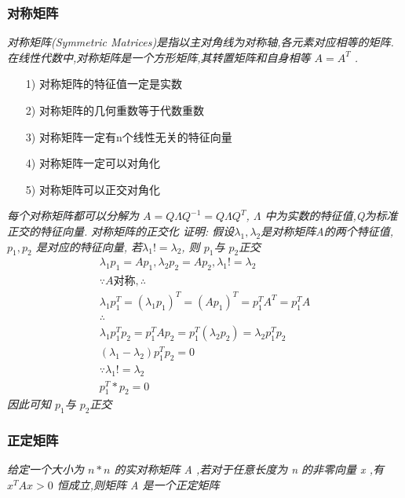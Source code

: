 \documentclass{scrartcl}
\numberwithin{equation}{section}   %
\begin{document}
\subsubsection{对称矩阵}
\textsl{
    对称矩阵(Symmetric Matrices)是指以主对角线为对称轴,各元素对应相等的矩阵. 在线性代数中,对称矩阵是一个方形矩阵,其转置矩阵和自身相等 $ A = A^T $ .
}
\begin{itemize}\item [1)] 对称矩阵的特征值一定是实数 \item [2)] 对称矩阵的几何重数等于代数重数\item [3)] 对称矩阵一定有n个线性无关的特征向量\item [4)] 对称矩阵一定可以对角化\item [5)] 对称矩阵可以正交对角化\end{itemize}
\textsl{ 每个对称矩阵都可以分解为 $ A = Q \Lambda Q^{-1} = Q \Lambda Q^{T} $, $ \Lambda $ 中为实数的特征值,Q为标准正交的特征向量. }
\textsl{对称矩阵的正交化
    证明: 假设$ \lambda_1, \lambda_2 $是对称矩阵A的两个特征值,$ p_1, p_2 $ 是对应的特征向量, 若$ \lambda_1 != \lambda_2 $, 则 $ p_1 $与 $ p_2 $正交}
\begin{equation}
    \begin{aligned}
        \lambda_1 p_1 = A p_1 , \lambda_2 p_2 = A p_2, \lambda_1 != \lambda_2           \\
        \because A对称, \therefore                                                      \\
        \lambda_1 p_1^T = (\lambda_1 p_1)^T = (A p_1)^T = p_1^T A^T = p_1^T A           \\
        \therefore                                                                      \\
        \lambda_1 p_1^T p_2 = p_1^T A p_2 = p_1^T (\lambda_2 p_2) = \lambda_2 p_1^T p_2 \\
        (\lambda_1 - \lambda_2) p_1^T p_2 = 0                                           \\
        \because    \lambda_1 != \lambda_2                                              \\
        p_1^T * p_2 =0
    \end{aligned}
\end{equation}
\textsl{
    因此可知 $p_1$与 $p_2$正交
}
\subsubsection{正定矩阵}
\textsl{
    给定一个大小为 $ n*n $ 的实对称矩阵 A ,若对于任意长度为 n 的非零向量 x ,有 $ x^T A x>0 $ 恒成立,则矩阵 A 是一个正定矩阵}
\end{document}
